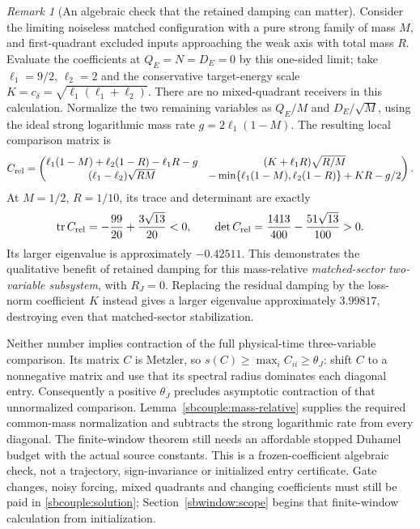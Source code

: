 \documentclass{article} %
\theoremstyle{plain}
\theoremstyle{definition}
\theoremstyle{remark}
\newtheorem{remark}[theorem]{Remark}
\begin{document}
\begin{remark}[An algebraic check that the retained damping can matter]
\label{sbcouple:spectral-check-legacy}
Consider the limiting noiseless matched configuration with a pure strong
family of mass $M$, and first-quadrant excluded inputs approaching the
weak axis with total mass $R$. Evaluate the coefficients at $Q_E=N=D_E=0$
by this one-sided limit; take $\ell_1=9/2$, $\ell_2=2$ and the conservative
target-energy scale $K=c_\delta=\sqrt{\ell_1(\ell_1+\ell_2)}$.
There are no mixed-quadrant receivers in this calculation.
Normalize the two remaining variables as $Q_E/M$ and $D_E/\sqrt M$,
using the ideal strong logarithmic mass rate $g=2\ell_1(1-M)$.
The resulting local comparison matrix is
\[
 C_{\rm rel}=\begin{pmatrix}
 \ell_1(1-M)+\ell_2(1-R)-\ell_1R-g
       &(K+\ell_1R)\sqrt{R/M}\\
 (\ell_1-\ell_2)\sqrt{RM}
       &-\min\{\ell_1(1-M),\ell_2(1-R)\}+KR-g/2
 \end{pmatrix}.
\]
At $M=1/2$, $R=1/10$, its trace and determinant are exactly
\[
 \operatorname{tr}C_{\rm rel}=-\frac{99}{20}+\frac{3\sqrt{13}}{20}<0,
 \qquad \det C_{\rm rel}=\frac{1413}{400}-\frac{51\sqrt{13}}{100}>0.
\]
Its larger eigenvalue is approximately $-0.42511$. This demonstrates the
qualitative benefit of retained damping for this mass-relative
\emph{matched-sector two-variable subsystem}, with $R_J=0$.
Replacing the residual damping by the loss-norm coefficient $K$ instead
gives a larger eigenvalue approximately $3.99817$, destroying even that
matched-sector stabilization.

Neither number implies contraction of the full physical-time
three-variable comparison. Its matrix $C$ is Metzler, so
$s(C)\ge\max_i C_{ii}\ge\theta_J$: shift $C$ to a nonnegative matrix
and use that its spectral radius dominates each diagonal entry.
Consequently a positive $\theta_J$ precludes asymptotic contraction of
that unnormalized comparison.  Lemma~\ref{sbcouple:mass-relative} supplies
the required common-mass normalization and subtracts the strong logarithmic
rate from every diagonal.  The finite-window theorem still needs an
affordable stopped Duhamel budget with the actual source constants. This is a
frozen-coefficient algebraic check, not a trajectory, sign-invariance or
initialized entry certificate. Gate changes, noisy forcing, mixed
quadrants and changing coefficients must still be paid in
\eqref{sbcouple:solution}; Section~\ref{sbwindow:scope} begins that
finite-window calculation from initialization.
\end{remark}
\end{document}
